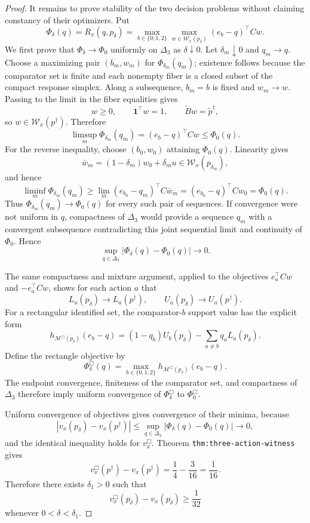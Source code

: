 \documentclass{article}
\begin{document}
\begin{proof}
It remains to prove stability of the two decision problems without claiming constancy of their optimizers.  Put
\[
 \Phi_\delta(q)=R_x(q,p_\delta)
 =\max_{b\in\{0,1,2\}}\max_{w\in\mathcal W_x(p_\delta)}(e_b-q)^\top Cw.
\]
We first prove that \(\Phi_\delta\to\Phi_0\) uniformly on \(\Delta_3\) as \(\delta\downarrow0\).  Let \(\delta_m\downarrow0\) and \(q_m\to q\).  Choose a maximizing pair \((b_m,w_m)\) for \(\Phi_{\delta_m}(q_m)\); existence follows because the comparator set is finite and each nonempty fiber is a closed subset of the compact response simplex.  Along a subsequence, \(b_m=b\) is fixed and \(w_m\to w\).  Passing to the limit in the fiber equalities gives
\[
 w\geq0,\qquad \mathbf1^\top w=1,\qquad \widetilde Bw=\widetilde p^\dagger,
\]
so \(w\in\mathcal W_x(p^\dagger)\).  Therefore
\[
 \limsup_m\Phi_{\delta_m}(q_m)
 =(e_b-q)^\top Cw
 \leq\Phi_0(q).
\]
For the reverse inequality, choose \((b_0,w_0)\) attaining \(\Phi_0(q)\).  Linearity gives
\[
 \bar w_m=(1-\delta_m)w_0+\delta_m u
 \in\mathcal W_x(p_{\delta_m}),
\]
and hence
\[
 \liminf_m\Phi_{\delta_m}(q_m)
 \geq\lim_m(e_{b_0}-q_m)^\top C\bar w_m
 =(e_{b_0}-q)^\top Cw_0
 =\Phi_0(q).
\]
Thus \(\Phi_{\delta_m}(q_m)\to\Phi_0(q)\) for every such pair of sequences.  If convergence were not uniform in \(q\), compactness of \(\Delta_3\) would provide a sequence \(q_m\) with a convergent subsequence contradicting this joint sequential limit and continuity of \(\Phi_0\).  Hence
\[
 \sup_{q\in\Delta_3}|\Phi_\delta(q)-\Phi_0(q)|\longrightarrow0.
\]

The same compactness and mixture argument, applied to the objectives \(e_a^\top Cw\) and \(-e_a^\top Cw\), shows for each action \(a\) that
\[
 L_a(p_\delta)\longrightarrow L_a(p^\dagger),
 \qquad
 U_a(p_\delta)\longrightarrow U_a(p^\dagger).
\]
For a rectangular identified set, the comparator-\(b\) support value has the explicit form
\[
 h_{\mathcal M^{\Box}(p_\delta)}(e_b-q)
 =(1-q_b)U_b(p_\delta)-\sum_{a\ne b}q_aL_a(p_\delta).
\]
Define the rectangle objective by
\[
 \Phi_\delta^{\Box}(q)
 =\max_{b\in\{0,1,2\}}h_{\mathcal M^{\Box}(p_\delta)}(e_b-q).
\]
The endpoint convergence, finiteness of the comparator set, and compactness of \(\Delta_3\) therefore imply uniform convergence of \(\Phi_\delta^{\Box}\) to \(\Phi_0^{\Box}\).

Uniform convergence of objectives gives convergence of their minima, because
\[
 |v_x(p_\delta)-v_x(p^\dagger)|
 \leq\sup_{q\in\Delta_3}|\Phi_\delta(q)-\Phi_0(q)|\longrightarrow0,
\]
and the identical inequality holds for \(v_x^{\Box}\).  Theorem \texttt{thm:three-action-witness} gives
\[
 v_x^{\Box}(p^\dagger)-v_x(p^\dagger)
 =\frac14-\frac3{16}=\frac1{16}.
\]
Therefore there exists \(\delta_1>0\) such that
\[
 v_x^{\Box}(p_\delta)-v_x(p_\delta)\geq\frac1{32}
\]
whenever \(0<\delta<\delta_1\).


\end{proof}
\end{document}
